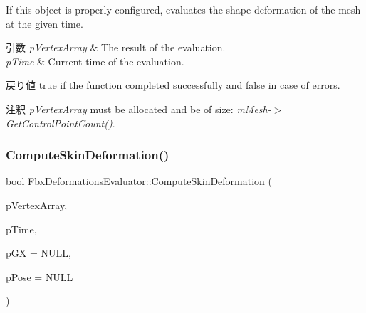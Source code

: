 If this object is properly configured, evaluates the shape deformation of the mesh at the given time. 
\begin{DoxyParams}{引数}
{\em p\+Vertex\+Array} & The result of the evaluation. \\
\hline
{\em p\+Time} & Current time of the evaluation. \\
\hline
\end{DoxyParams}
\begin{DoxyReturn}{戻り値}
{\ttfamily true} if the function completed successfully and {\ttfamily false} in case of errors. 
\end{DoxyReturn}
\begin{DoxyRemark}{注釈}
{\itshape p\+Vertex\+Array} must be allocated and be of size\+: {\itshape m\+Mesh-\/$>$Get\+Control\+Point\+Count()}. 
\end{DoxyRemark}
\mbox{\label{class_fbx_deformations_evaluator_a0bd5a2a85b36ff78be4739de7cc9918e}} 
\subsubsection{\texorpdfstring{Compute\+Skin\+Deformation()}{ComputeSkinDeformation()}}
{\footnotesize\ttfamily bool Fbx\+Deformations\+Evaluator\+::\+Compute\+Skin\+Deformation (\begin{DoxyParamCaption}\item[{\hyperlink{class_fbx_vector4}{Fbx\+Vector4} $\ast$}]{p\+Vertex\+Array,  }\item[{const \hyperlink{class_fbx_time}{Fbx\+Time} \&}]{p\+Time,  }\item[{\hyperlink{class_fbx_a_matrix}{Fbx\+A\+Matrix} $\ast$}]{p\+GX = {\ttfamily \hyperlink{fbxarch_8h_a070d2ce7b6bb7e5c05602aa8c308d0c4}{N\+U\+LL}},  }\item[{const \hyperlink{class_fbx_pose}{Fbx\+Pose} $\ast$}]{p\+Pose = {\ttfamily \hyperlink{fbxarch_8h_a070d2ce7b6bb7e5c05602aa8c308d0c4}{N\+U\+LL}} }\end{DoxyParamCaption})}


